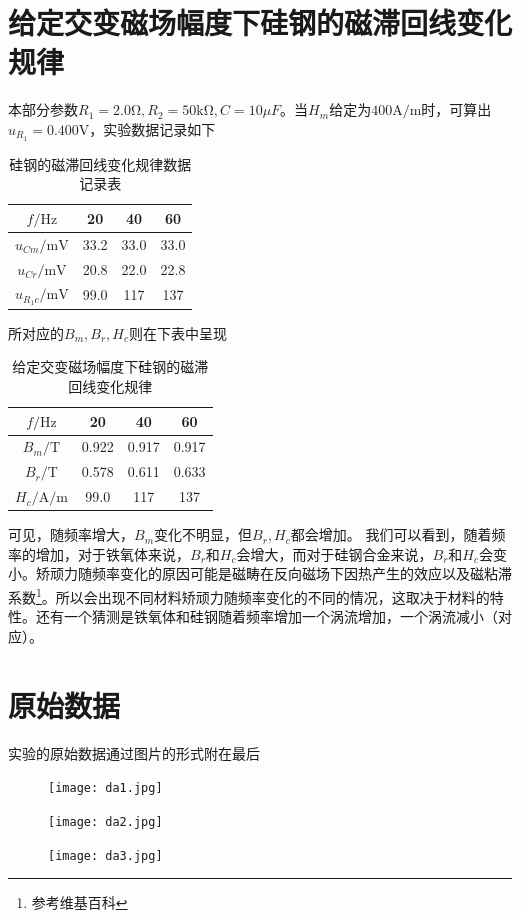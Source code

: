 \documentclass{ctexart}
\begin{document}
	\section{给定交变磁场幅度下硅钢的磁滞回线变化规律}
	本部分参数$R_1=2.0\mathrm{\Omega},R_2=50\mathrm{k\Omega},C=10\mu F$。当$H_m$给定为$400\mathrm{A/m}$时，可算出$u_{R_1}=0.400\mathrm{V}$，实验数据记录如下
	\begin{table}[H]
		\begin{center}
			\caption{硅钢的磁滞回线变化规律数据记录表}
			\begin{tabular}{c|ccc}
				$f/\mathrm{Hz}$&20&40&60\\\hline
				$u_{Cm}/\mathrm{mV}$&33.2&33.0&33.0\\\hline
				$u_{Cr}/\mathrm{mV}$&20.8&22.0&22.8\\\hline
				$u_{R_1c}/\mathrm{mV}$&99.0&117&137
			\end{tabular}
		\end{center}
	\end{table}
	所对应的$B_m,B_r,H_c$则在下表中呈现
	\begin{table}[H]
		\begin{center}
			\caption{给定交变磁场幅度下硅钢的磁滞回线变化规律}
			\begin{tabular}{c|ccc}
				$f/\mathrm{Hz}$&20&40&60\\\hline
				$B_m/\mathrm{T}$&0.922&0.917&0.917\\\hline
				$B_r/\mathrm{T}$&0.578&0.611&0.633\\\hline
				$H_c/\mathrm{A/m}$&99.0&117&137
			\end{tabular}
		\end{center}
	\end{table}
	可见，随频率增大，$B_m$变化不明显，但$B_r,H_c$都会增加。
	我们可以看到，随着频率的增加，对于铁氧体来说，$B_r$和$H_c$会增大，而对于硅钢合金来说，$B_r$和$H_c$会变小。矫顽力随频率变化的原因可能是磁畴在反向磁场下因热产生的效应以及磁粘滞系数\footnote{参考维基百科}。所以会出现不同材料矫顽力随频率变化的不同的情况，这取决于材料的特性。还有一个猜测是铁氧体和硅钢随着频率增加一个涡流增加，一个涡流减小（对应）。
	\section{原始数据}
	实验的原始数据通过图片的形式附在最后
	\begin{figure}[H]
		\centering
		\texttt{[image: da1.jpg]}
	\end{figure}
	\begin{figure}[H]
		\centering
		\texttt{[image: da2.jpg]}
	\end{figure}
	\begin{figure}[H]
		\centering
		\texttt{[image: da3.jpg]}
	\end{figure}
\end{document}
